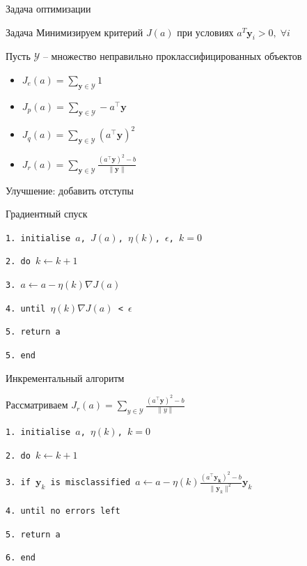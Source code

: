 \documentclass[10pt,a4paper]{beamer}
\begin{document}
\begin{frame}{Задача оптимизации}

\begin{block}{Задача}
Минимизируем критерий $J(a)$ при условиях $a^T \mathbf{y}_i > 0, \; \forall i$
\end{block}

Пусть $\mathcal{Y}$ -- множество неправильно проклассифицированных объектов
\begin{itemize}
\item $J_e(a) = \sum_{\mathbf{y} \in \mathcal{Y}} 1$ 
\item $J_p(a) = \sum_{\mathbf{y} \in \mathcal{Y}} - a^\top \mathbf{y}$ 
\item $J_q(a) = \sum_{\mathbf{y} \in \mathcal{Y}} (a^\top \mathbf{y})^2$
\item $J_r(a) = \sum_{\mathbf{y} \in \mathcal{Y}} \frac{(a^\top \mathbf{y})^2 - b}{\|\mathbf{y}\|}$
\end{itemize}
Улучшение: добавить отступы

\end{frame}


\begin{frame}{Градиентный спуск}


\texttt{1. initialise $a$, $J(a)$, $\eta(k)$, $\epsilon$, $k=0$}

\texttt{2. \;\; do $k \leftarrow k + 1$}

\texttt{3. \;\;\;\; $a \leftarrow a - \eta(k) \nabla J(a) $}

\texttt{4. \;\; until $\eta(k) \nabla J(a)$ < $\epsilon$}

\texttt{5. return a}

\texttt{5. end}

\vspace{0.5em}

\end{frame}


\begin{frame}{Инкрементальный алгоритм}

Рассматриваем $J_r(a) = \sum_{y \in \mathcal{Y}} \frac{(a^\top \mathbf{y})^2 - b}{\|y\|}$
\vspace{1em}

\texttt{1. initialise $a$, $\eta(k)$, $k=0$}

\texttt{2. \;\; do $k \leftarrow k + 1$}

\texttt{3. \;\;\;\; if $\mathbf{y}_k$ is misclassified $a \leftarrow a - \eta(k)\frac{(a^\top \mathbf{y_k})^2 - b}{\|\mathbf{y}_k\|^2} \mathbf{y}_k $}

\texttt{4. \;\; until no errors left}

\texttt{5. return a}

\texttt{6. end}

\vspace{0.5em}

\end{frame}
\end{document}
